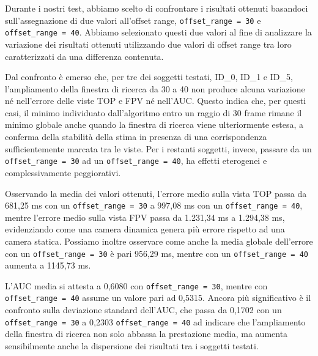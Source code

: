 \begin{flushleft}
Durante i nostri test, abbiamo scelto di confrontare i risultati ottenuti basandoci sull'assegnazione di due valori all'offset range, \texttt{offset\_range = 30} e \texttt{offset\_range = 40}. Abbiamo selezionato questi due valori al fine di analizzare la variazione dei risultati ottenuti utilizzando due valori di offset range tra loro caratterizzati da una differenza contenuta.


Dal confronto è emerso che, per tre dei soggetti testati, ID\_0, ID\_1 e ID\_5, l'ampliamento della finestra di ricerca da 30 a 40 non produce alcuna variazione né nell'errore delle viste TOP e FPV né nell'AUC. Questo indica che, per questi casi, il minimo individuato dall'algoritmo entro un raggio di 30 frame rimane il minimo globale anche quando la finestra di ricerca viene ulteriormente estesa, a conferma della stabilità della stima in presenza di una corrispondenza sufficientemente marcata tra le viste.
Per i restanti soggetti, invece, passare da un \texttt{offset\_range = 30} ad un \texttt{offset\_range = 40}, ha effetti eterogenei e complessivamente peggiorativi. 


Osservando la media dei valori ottenuti, l'errore medio sulla vista TOP passa da 681,25 ms con un \texttt{offset\_range = 30} a 997,08 ms con un \texttt{offset\_range = 40}, mentre l'errore medio sulla vista FPV passa da 1.231,34 ms a 1.294,38 ms, evidenziando come una camera dinamica genera più errore rispetto ad una camera statica. Possiamo inoltre osservare come anche la media globale dell'errore con un \texttt{offset\_range = 30} è pari 956,29 ms, mentre con un \texttt{offset\_range = 40} aumenta a 1145,73 ms. 


L'AUC media si attesta a 0,6080 con \texttt{offset\_range = 30}, mentre con \texttt{offset\_range = 40} assume un valore pari ad 0,5315.
Ancora più significativo è il confronto sulla deviazione standard dell'AUC, che passa da 0,1702 con un \texttt{offset\_range = 30} a 0,2303 \texttt{offset\_range = 40} ad indicare che l'ampliamento della finestra di ricerca non solo abbassa la prestazione media, ma aumenta sensibilmente anche la dispersione dei risultati tra i soggetti testati.


\end{flushleft}
